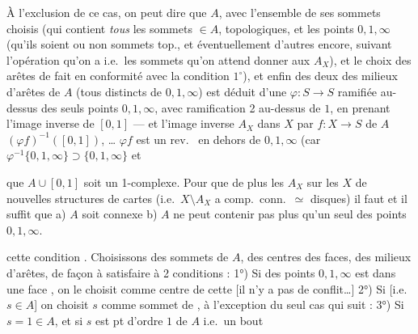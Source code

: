 \documentclass[11pt,a4paper]{article}
\begin{document}
À l'exclusion de ce cas, on peut dire
que $A$, avec l'ensemble de ses sommets
choisis (qui contient \emph{tous} les sommets  $\in A$,
topologiques, et les points $0, 1, \infty$ (qu'ils
soient ou non sommets top., et éventuellement
d'autres encore, suivant l'opération
qu'on a  i.e.\ les sommets
qu'on attend donner aux $A_X$), et
le choix des arêtes de  fait
en conformité avec la condition $1^{\circ}$),
et enfin des deux \emph{} des
milieux d'arêtes de $A$ (tous distincts
 de $0, 1, \infty$) est déduit d'une
 $\varphi : S \to S$ ramifiée au-dessus des
seuls points $0, 1, \infty$, avec ramification
2 au-dessus de $1$, en prenant l'image
inverse de $[0,1]$ --- et l'image inverse
 $A_X$ dans $X$ par $f : X \to S$ de
$A$   $(\varphi f)^{-1}([0,1])$, \ldots
$\varphi f$ est  un rev.\  en dehors de
$0, 1, \infty$ (car $\varphi^{-1}\{0,1,\infty\} \supset \{0,1,\infty\}$ et

que $A \cup [0,1]$ soit un 1-complexe.
Pour que de plus les $A_X$   \struck{\ill{}}
sur les $X$ de nouvelles structures de
cartes (i.e.\ $X \setminus A_X$ a comp.\ conn.\ $\simeq$ disques)
il faut et il suffit que a) $A$  soit connexe
 
\struck{\ill{} \ill{}} 
b) $A$ \struck{\ill{}} ne peut contenir pas plus qu'un seul
des points $0, 1, \infty$.

 cette condition . Choisissons
des sommets de $A$,  des centres des
faces, des milieux d'arêtes, de façon
à satisfaire à 2 conditions :
1°) Si \struck{\ill{}} des points $0, 1, \infty$ est dans une
face , on le choisit comme
centre de cette [il n'y a pas de conflit\ldots]
2°) Si  [i.e.\  $s \in A$] on choisit $s$
comme sommet de  , \struck{\ill{}} à l'exception
du seul cas qui suit :
3°) Si $s = 1 \in A$, et si $s$ est  pt
d'ordre $1$ de $A$
i.e.\ un bout
\end{document}
